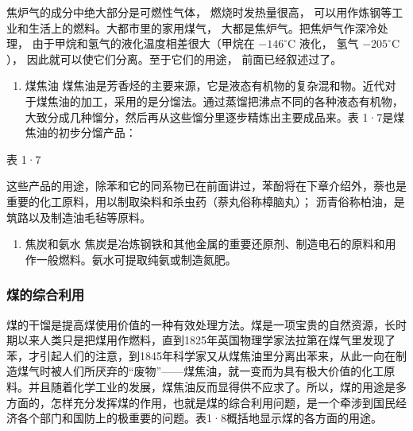 焦炉气的成分中绝大部分是可燃性气体， 燃烧时发热量很高，
可以用作炼钢等工业和生活上的燃料。大都市里的家用煤气，
大都是焦炉气。把焦炉气作深冷处理，
由于甲烷和氢气的液化温度相差很大（甲烷在 \(-146^{\circ}\mathrm{C}\)
液化， 氢气 \(-205^{\circ}\mathrm{C}\)），
因此就可以使它们分离。至于它们的用途， 前面已经叙述过了。

\begin{enumerate}[start=2]
\item
  煤焦油
  煤焦油是芳香烃的主要来源，它是液态有机物的复杂混和物。近代对于煤焦油的加工，采用的是分馏法。通过蒸馏把沸点不同的各种液态有机物，大致分成几种馏分，然后再从这些馏分里逐步精炼出主要成品来。表
  1·7是煤焦油的初步分馏产品：
\end{enumerate}

表 1·7

{\centering\footnotesize\setlength{\tabcolsep}{4pt}%
}

这些产品的用途，除苯和它的同系物已在前面讲过，苯酚将在下章介绍外，萘也是重要的化工原料，用以制取染料和杀虫药（萘丸俗称樟脑丸）；
沥青俗称柏油，是筑路以及制造油毛毡等原料。

\begin{enumerate}[start=3]
\item
  焦炭和氨水
  焦炭是冶炼钢铁和其他金属的重要还原剂、制造电石的原料和用作一般燃料。氨水可提取纯氨或制造氮肥。
\end{enumerate}

\subsubsection{煤的综合利用}

煤的干馏是提高煤使用价值的一种有效处理方法。煤是一项宝贵的自然资源，长时期以来人类只是把煤用作燃料，直到1825年英国物理学家法拉第在煤气里发现了苯，才引起人们的注意，到1845年科学家又从煤焦油里分离出苯来，从此一向在制造煤气时被人们所厌弃的``废物''------煤焦油，就一变而为具有极大价值的化工原料。并且随着化学工业的发展，煤焦油反而显得供不应求了。所以，煤的用途是多方面的，怎样充分发挥煤的作用，也就是煤的综合利用问题，是一个牵涉到国民经济各个部门和国防上的极重要的问题。表1·8概括地显示煤的各方面的用途。

